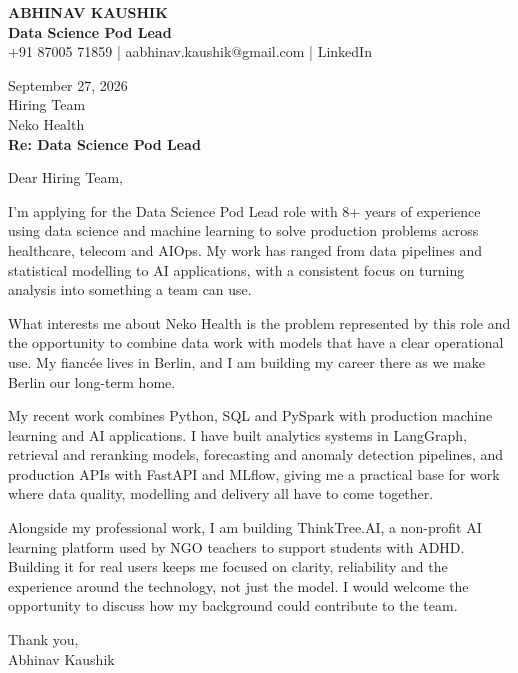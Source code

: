 \documentclass[10pt,a4paper]{article}
\begin{document}
\begin{center}
{\Large\bfseries ABHINAV KAUSHIK}\\[2pt]
{\bfseries Data Science Pod Lead}\\[2pt]
+91 87005 71859 \quad | \quad aabhinav.kaushik@gmail.com \quad | \quad LinkedIn
\end{center}
\vspace{8pt}
September 27, 2026\\[6pt]
Hiring Team\\
Neko Health\\[4pt]
\textbf{Re: Data Science Pod Lead}

Dear Hiring Team,

I’m applying for the Data Science Pod Lead role with 8+ years of experience using data science and machine learning to solve production problems across healthcare, telecom and AIOps. My work has ranged from data pipelines and statistical modelling to AI applications, with a consistent focus on turning analysis into something a team can use.

What interests me about Neko Health is the problem represented by this role and the opportunity to combine data work with models that have a clear operational use. My fiancée lives in Berlin, and I am building my career there as we make Berlin our long-term home.

My recent work combines Python, SQL and PySpark with production machine learning and AI applications. I have built analytics systems in LangGraph, retrieval and reranking models, forecasting and anomaly detection pipelines, and production APIs with FastAPI and MLflow, giving me a practical base for work where data quality, modelling and delivery all have to come together.

Alongside my professional work, I am building ThinkTree.AI, a non-profit AI learning platform used by NGO teachers to support students with ADHD. Building it for real users keeps me focused on clarity, reliability and the experience around the technology, not just the model. I would welcome the opportunity to discuss how my background could contribute to the team.

Thank you,\\
Abhinav Kaushik
\end{document}
